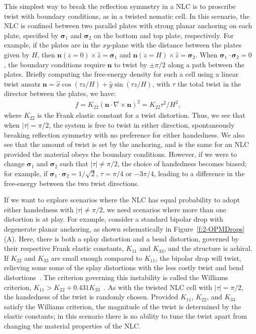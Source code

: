 This simplest way to break the reflection symmetry in a NLC is to proscribe twist with boundary conditions, as in a twisted nematic cell.
In this scenario, the NLC is confined between two parallel plates with strong planar anchoring on each plate, specified by $\bm{\sigma}_1$ and $\bm{\sigma}_2$ on the bottom and top plate, respectively.
For example, if the plates are in the $xy$-plane with the distance between the plates given by $H$, then $\mathbf{n}(z = 0) \times \hat{z} = \bm{\sigma}_1$ and $\mathbf{n}(z = H) \times \hat{z} = \bm{\sigma}_2$.
When $\bm{\sigma}_1 \cdot \bm{\sigma}_2 = 0$, the boundary conditions require $\mathbf{n}$ to twist by $\pm \pi/2$ along a path between the plates.
Briefly computing the free-energy density for such a cell using a linear twist ansatz $\mathbf{n} = \hat{x} \cos (\tau z/H) + \hat{y} \sin(\tau z/H)$, with $\tau$ the total twist in the director between the plates, we have:
\begin{align}
  f = K_{22}(\mathbf{n} \cdot \nabla \times \mathbf{n})^2 = K_{22}\tau^2/H^2,
\end{align}
where $K_{22}$ is the Frank elastic constant for a twist distortion.
Thus, we see that when $|\tau| = \pi/2$, the system is free to twist in either direction, spontaneously breaking reflection symmetry with no preference for either handedness.
We also see that the amount of twist is set by the anchoring, and is the same for an NLC provided the material obeys the boundary conditions.
However, if we were to change $\bm{\sigma}_1$ and $\bm{\sigma}_2$ such that $|\tau| \neq \pi/2$, the choice of handedness becomes biased; for example, if $\bm{\sigma}_1 \cdot \bm{\sigma}_2 = 1/\sqrt{2}$, $\tau = \pi/4$ or $-3\pi/4$, leading to a difference in the free-energy between the two twist directions.

If we want to explore scenarios where the NLC has equal probability to adopt either handedness with $|\tau| \neq \pi/2$, we need scenarios where more than one distortion is at play.
For example, consider a standard bipolar drop with degenerate planar anchoring, as shown schematically in Figure~\ref{f:2-OPMDrops}(A).
Here, there is both a splay distortion and a bend distortion, governed by their respective Frank elastic constants, $K_{11}$ and $K_{33}$, and the structure is achiral.
If $K_{22}$ and $K_{33}$ are small enough compared to $K_{11}$, the bipolar drop will twist, relieving some some of the splay distortions with the less costly twist and bend distortions~\cite{RN297,RN296,RN295}.
The criterion governing this instability is called the Williams criterion, $K_{11} > K_{22}+ 0.431 K_{33}$~\cite{RN297}.
As with the twisted NLC cell with $|\tau| = \pi/2$, the handedness of the twist is randomly chosen.
Provided $K_{11}$, $K_{22}$, and $K_{33}$ satisfy the Williams criterion, the magnitude of the twist is determined by the elastic constants; in this scenario there is no ability to tune the twist apart from changing the material properties of the NLC.

